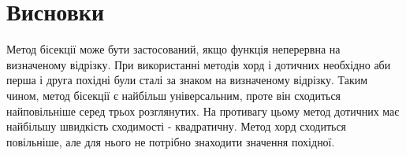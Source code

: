 \documentclass{report}
\begin{document}
\section*{Висновки}
Метод бісекції може бути застосований, якщо функція неперервна на визначеному відрізку. При використанні методів хорд і дотичних необхідно аби перша і друга похідні були сталі за знаком на визначеному відрізку. Таким чином, метод бісекції є найбільш універсальним, проте він сходиться найповільніше серед трьох розглянутих. На противагу цьому метод дотичних має найбільшу швидкість сходимості - квадратичну. Метод хорд сходиться повільніше, але для нього не потрібно знаходити значення похідної.
\end{document}
